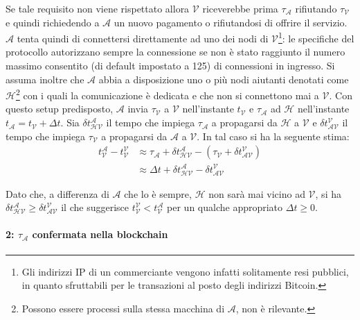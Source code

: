 Se tale requisito non viene rispettato allora $\mathcal{V}$ riceverebbe prima $\tau_\mathcal{A}$ rifiutando $\tau_\mathcal{V}$ e quindi richiedendo a $\mathcal{A}$ un nuovo pagamento o rifiutandosi di offrire il servizio.\\
$\mathcal{A}$ tenta quindi di connettersi direttamente ad uno dei nodi di $\mathcal{V}$\footnote{Gli indirizzi IP di un commerciante vengono infatti solitamente resi pubblici, in quanto sfruttabili per le transazioni al posto degli indirizzi Bitcoin.}: le specifiche del protocollo autorizzano sempre la connessione se non è stato raggiunto il numero massimo consentito (di default impostato a 125) di connessioni in ingresso. Si assuma inoltre che $\mathcal{A}$ abbia a disposizione uno o più nodi aiutanti denotati come $\mathcal{H}$\footnote{Possono essere processi sulla stessa macchina di $\mathcal{A}$, non è rilevante.} con i quali la comunicazione è dedicata e che non si connettono mai a $\mathcal{V}$. Con questo setup predisposto, $\mathcal{A}$ invia $\tau_\mathcal{V}$ a $\mathcal{V}$ nell'instante $t_\mathcal{V}$ e $\tau_\mathcal{A}$ ad $\mathcal{H}$ nell'instante $t_\mathcal{A} = t_\mathcal{V} + \Delta t$. Sia $\delta t^\mathcal{A}_\mathcal{HV}$ il tempo che impiega $\tau_\mathcal{A}$ a propagarsi da $\mathcal{H}$ a $\mathcal{V}$ e $\delta t^\mathcal{V}_\mathcal{AV}$ il tempo che impiega $\tau_\mathcal{V}$ a propagarsi da $\mathcal{A}$ a $\mathcal{V}$. In tal caso si ha la seguente stima:
\begin{align*}
t^\mathcal{A}_\mathcal{V} - t^\mathcal{V}_\mathcal{V} &\approx \tau_\mathcal{A} + \delta t^\mathcal{A}_\mathcal{HV} - \left( \tau_\mathcal{V} + \delta t^\mathcal{V}_\mathcal{AV} \right) \\
&\approx \Delta t + \delta t^\mathcal{A}_\mathcal{HV} - \delta t^\mathcal{V}_\mathcal{AV}
\end{align*}

Dato che, a differenza di $\mathcal{A}$ che lo è sempre, $\mathcal{H}$ non sarà mai vicino ad $\mathcal{V}$, si ha $\delta t^\mathcal{A}_\mathcal{HV} \geq \delta t^\mathcal{V}_\mathcal{AV}$ il che suggerisce $t^\mathcal{V}_\mathcal{V} < t^\mathcal{A}_\mathcal{V}$ per un qualche appropriato $\Delta t \geq 0$.

\paragraph{2: $\tau_\mathcal{A}$ confermata nella blockchain}

